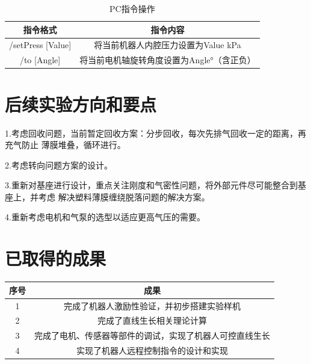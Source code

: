 \documentclass[11pt, a4paper, oneside]{ctexart}
\begin{document}
\begin{table}[H]
    \centering
    \caption{PC指令操作}
    \begin{tabular}{cc}
        \toprule
        指令格式 & 指令内容 \\ 
        \midrule
        /setPress [Value] & 将当前机器人内腔压力设置为Value kPa\\
        /to [Angle] & 将当前电机轴旋转角度设置为Angle°（含正负）\\
        \bottomrule
    \end{tabular}
\end{table}

\section{后续实验方向和要点}
1.考虑回收问题，当前暂定回收方案：分步回收，每次先排气回收一定的距离，再充气防止
薄膜堆叠，循环进行。

2.考虑转向问题方案的设计。

3.重新对基座进行设计，重点关注刚度和气密性问题，将外部元件尽可能整合到基座上，并考虑
解决塑料薄膜缠绕脱落问题的解决方案。

4.重新考虑电机和气泵的选型以适应更高气压的需要。

\section{已取得的成果}
\begin{table}[H]
    \centering
    \begin{tabular}{cc}
        \toprule
        序号 & 成果 \\ 
        \midrule
        1 & 完成了机器人激励性验证，并初步搭建实验样机\\
        2 & 完成了直线生长相关理论计算\\
        3 & 完成了电机、传感器等部件的调试，实现了机器人可控直线生长\\
        4 & 实现了机器人远程控制指令的设计和实现\\
        \bottomrule
    \end{tabular}
\end{table}

\newpage
\nocite{*}


\end{document}
